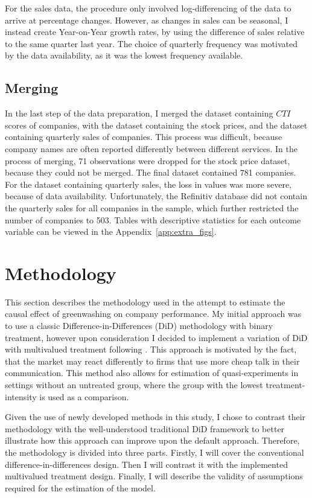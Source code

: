 \documentclass[12pt]{article}
\begin{document}
For the sales data, the procedure only involved log-differencing of the data to arrive at percentage changes. However, as changes in sales can be seasonal, I instead create Year-on-Year growth rates, by using the difference of sales relative to the same quarter last year. The choice of quarterly frequency was motivated by the data availability, as it was the lowest frequency available. 


\subsection{Merging}

In the last step of the data preparation, I merged the dataset containing $CTI$ scores of companies, with the dataset containing the stock prices, and the dataset containing quarterly sales of companies. This process was difficult, because company names are often reported differently between different services. In the process of merging, 71 observations were dropped for the stock price dataset, because they could not be merged. The final dataset contained 781 companies. For the dataset containing quarterly sales, the loss in values was more severe, because of data availability. Unfortunately, the Refinitiv database did not contain the quarterly sales for all companies in the sample, which further restricted the number of companies to 503. Tables with descriptive statistics for each outcome variable can be viewed in the Appendix~\ref{app:extra_figs}.


\section{Methodology}\label{sect:methodology}

This section describes the methodology used in the attempt to estimate the causal effect of greenwashing on company performance.
My initial approach was to use a classic Difference-in-Differences (DiD) methodology with binary treatment, however upon consideration I decided to implement a variation of DiD with multivalued treatment following \textcite{callawayDifferenceinDifferencesContinuousTreatment2025}. This approach is motivated by the fact, that the market may react differently to firms that use more cheap talk in their communication. This method also allows for estimation of quasi-experiments in settings without an untreated group, where the group with the lowest treatment-intensity is used as a comparison. 

Given the use of newly developed methods in this study, I chose to contrast their methodology with the well-understood traditional DiD framework to better illustrate how this approach can improve upon the default approach. Therefore, the methodology is divided into three parts. Firstly, I will cover the conventional difference-in-differences design. Then I will contrast it with the implemented multivalued treatment design. Finally, I will describe the validity of assumptions required for the estimation of the model.
\end{document}
